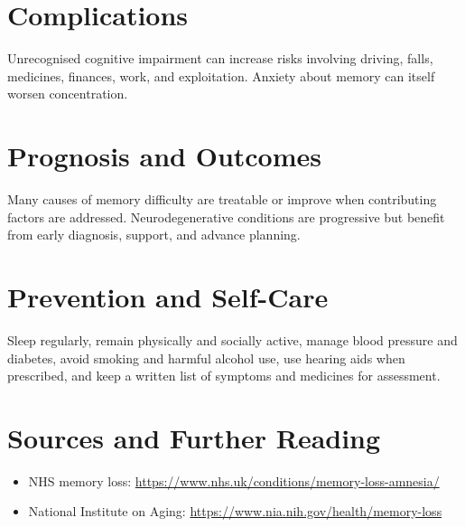 \section*{Complications}
Unrecognised cognitive impairment can increase risks involving driving, falls, medicines, finances, work, and exploitation. Anxiety about memory can itself worsen concentration.
\section*{Prognosis and Outcomes}
Many causes of memory difficulty are treatable or improve when contributing factors are addressed. Neurodegenerative conditions are progressive but benefit from early diagnosis, support, and advance planning.
\section*{Prevention and Self-Care}
Sleep regularly, remain physically and socially active, manage blood pressure and diabetes, avoid smoking and harmful alcohol use, use hearing aids when prescribed, and keep a written list of symptoms and medicines for assessment.
\section*{Sources and Further Reading}
\begin{itemize}
    \item NHS memory loss: \url{https://www.nhs.uk/conditions/memory-loss-amnesia/}
    \item National Institute on Aging: \url{https://www.nia.nih.gov/health/memory-loss}
\end{itemize}
